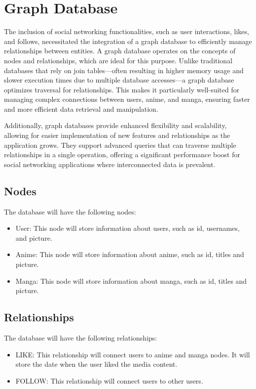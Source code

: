 \newpage

\section*{Graph Database}

The inclusion of social networking functionalities, such as user interactions, likes, and follows, necessitated the
integration of a graph database to efficiently manage relationships between entities. A graph database operates on
the concepts of nodes and relationships, which are ideal for this purpose. Unlike traditional databases that rely on
join tables—often resulting in higher memory usage and slower execution times due to multiple database accesses—a graph
database optimizes traversal for relationships. This makes it particularly well-suited for managing complex connections
between users, anime, and manga, ensuring faster and more efficient data retrieval and manipulation.

\vspace{\baselineskip}

Additionally, graph databases provide enhanced flexibility and scalability, allowing for easier implementation of
new features and relationships as the application grows. They support advanced queries that can traverse multiple
relationships in a single operation, offering a significant performance boost for social networking applications
where interconnected data is prevalent.

\subsection*{Nodes}

The database will have the following nodes:
\begin{itemize}
    \item User: This node will store information about users, such as id, usernames, and picture.
    \item Anime: This node will store information about anime, such as id, titles and picture.
    \item Manga: This node will store information about manga, such as id, titles and picture.
\end{itemize}

\subsection*{Relationships}

The database will have the following relationships:
\begin{itemize}
    \item LIKE\@: This relationship will connect users to anime and manga nodes. It will store the date when the user liked the media content.
    \item FOLLOW\@: This relationship will connect users to other users.
\end{itemize}

